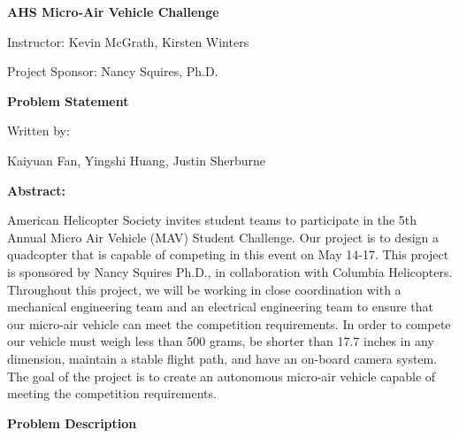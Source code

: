\documentclass[10pt,letterpaper,onecolumn]{article}
\begin{document}
\begin{titlepage}
\begin{center}
\vspace*{3cm}
\huge{\textbf{AHS Micro-Air Vehicle Challenge}}\par
\vspace{2cm}
\large{Instructor: Kevin McGrath, Kirsten Winters}\par
\vspace{3mm}
\large{Project Sponsor: Nancy Squires, Ph.D.}\par
\vspace{1cm}
\huge{\textbf{Problem Statement}}\par
\vspace{1cm}
\large{Written by:}\par
\vspace{3mm}
\normalsize{Kaiyuan Fan, Yingshi Huang, Justin Sherburne}\par
\vspace{25mm}
\large{\textbf{Abstract:}}\par
\vspace{4mm}
\end{center}
\normalsize{American Helicopter Society invites student teams to participate in the 5th Annual Micro Air Vehicle (MAV) Student Challenge. Our project is to design a quadcopter that is capable of competing in this event on May 14-17. This project is sponsored by Nancy Squires Ph.D., in collaboration with Columbia Helicopters. Throughout this project, we will be working in close coordination with a mechanical engineering team and an electrical engineering team to ensure that our micro-air vehicle can meet the competition requirements. In order to compete our vehicle must weigh less than 500 grams, be shorter than 17.7 inches in any dimension, maintain a stable flight path, and have an on-board camera system. The goal of the project is to create an autonomous micro-air vehicle capable of meeting the competition requirements.}

\end{titlepage}


\newpage

\begin{center}
\large
\textbf{Problem Description}
\end{center}
\end{document}
